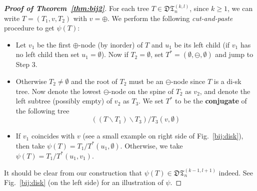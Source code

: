 \documentclass[12pt]{amsart}
\numberwithin{equation}{section}
\theoremstyle{plain}
\theoremstyle{definition}
\newcommand{\DT}{\mathfrak{DT}}
\begin{document}
\begin{proof}[{\bf Proof of Theorem~\ref{thm:bij2}}]
For each tree $T\in\DT_n^{(k,l)}$, since $k\geq1$, we can write $T=(T_1,v,T_2)$ with $v=\oplus$. We perform the following {\em cut-and-paste} procedure to get $\psi(T)$: 
\begin{itemize}
\item[Step 1] Let $v_1$ be the first $\oplus$-node (by inorder) of $T$ and $u_1$ be its left child (if $v_1$ has no left child then set $u_1=\emptyset$). Now if $T_2=\emptyset$, set $T^*=(\emptyset,\ominus,\emptyset)$ and jump to Step 3.

\item[Step 2] Otherwise $T_2\neq\emptyset$ and the root of $T_2$ must be an $\ominus$-node since $T$ is a di-sk tree. Now denote the lowest $\ominus$-node on the spine of $T_2$ as $v_2$, and denote the left subtree (possibly empty) of $v_2$ as $T_3$. We set $T^*$ to be the {\bf conjugate} of the following tree
$$((T\backslash T_1)\backslash T_3)/T_3(v,\emptyset)$$

\item[Step 3] If $v_1$ coincides with $v$ (see a small example on right side of Fig.~\ref{bij:disk}), then take $\psi(T)=T_1/T^*(u_1,\emptyset)$. Otherwise, we take $\psi(T)=T_1/T^*(u_1,v_1)$.
\end{itemize}
It should be clear from our construction that $\psi(T)\in\DT_n^{(k-1,l+1)}$ indeed. See Fig.~\ref{bij:disk}  (on the left side) for an illustration of $\psi$. 


\end{proof}
\end{document}

